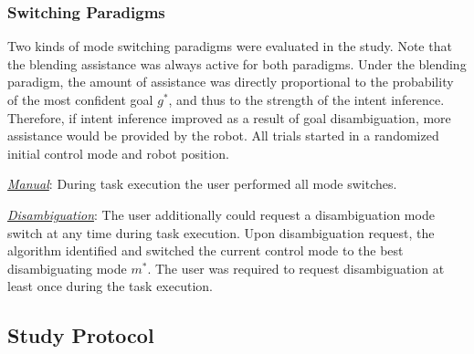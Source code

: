 \subsubsection{Switching Paradigms}
Two kinds of mode switching paradigms were evaluated in the study. Note that the blending assistance was always active for both paradigms. Under the blending paradigm, the amount of assistance was directly proportional to the probability of the most confident goal $g^*$, and thus to the strength of the intent inference. Therefore, if intent inference improved as a result of goal disambiguation, more assistance would be provided by the robot. All trials started in a randomized initial control mode and robot position. 

\noindent\underline{\textit{Manual}}: During task execution the user performed all mode switches. 

\noindent\underline{\textit{Disambiguation}}: The user additionally could request a disambiguation mode switch at any time during task execution. Upon disambiguation request, the algorithm identified and switched the current control mode to the best disambiguating mode $m^*$. The user was required to request disambiguation at least once during the task execution.  



\subsection{Study Protocol}
 
